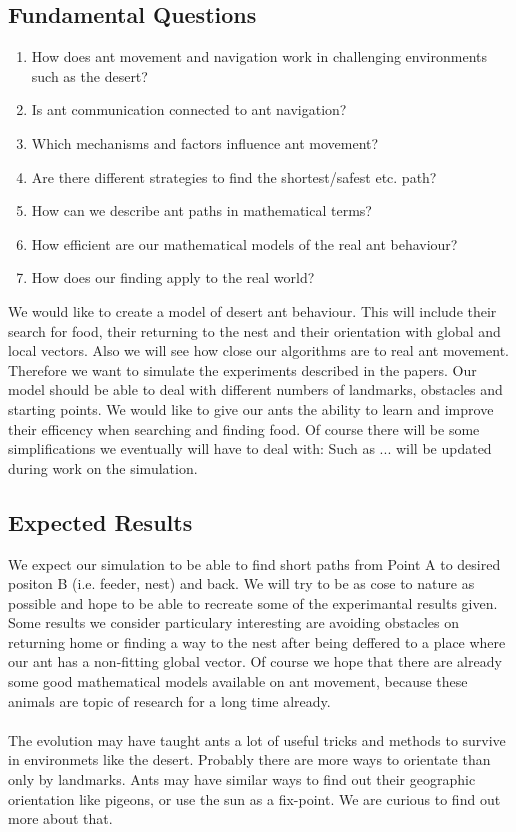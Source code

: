 \documentclass[11pt]{article}
\begin{document}
\subsection*{Fundamental Questions}
\begin{enumerate}
\item How does ant movement and navigation work in challenging environments such as the desert?
\item Is ant communication connected to ant navigation?
\item Which mechanisms and factors influence ant movement?
\item Are there different strategies to find the shortest/safest etc. path?
\item How can we describe ant paths in mathematical terms?
\item How efficient are our mathematical models of the real ant behaviour?
\item How does our finding apply to the real world?
\end{enumerate}

We would like to create a model of desert ant behaviour. This will include their search for food, their returning to the nest and their orientation with global and local vectors. Also we will see how close our algorithms are to real ant movement. Therefore we want to simulate the experiments described in the papers. Our model should be able to deal with different numbers of landmarks, obstacles and starting points. We would like to give our ants the ability to learn and improve their efficency when searching and finding food. Of course there will be some simplifications we eventually will have to deal with: Such as ... will be updated during work on the simulation.

\subsection*{Expected Results}

We expect our simulation to be able to find short paths from Point A to desired positon B (i.e. feeder, nest) and back. We will try to be as cose to nature as possible and hope to be able to recreate some of the experimantal results given. Some results we consider particulary interesting are avoiding obstacles on returning home or finding a way to the nest after being deffered to a place where our ant has a non-fitting global vector. Of course we hope that there are already some good mathematical models available on ant movement, because these animals are topic of research for a long time already.
\\\\
The evolution may have taught ants a lot of useful tricks and methods to survive in environmets like the desert. Probably there are more ways to orientate than only by landmarks. Ants may have similar ways to find out their geographic orientation like pigeons, or use the sun as a fix-point. We are curious to find out more about that.
\end{document}
